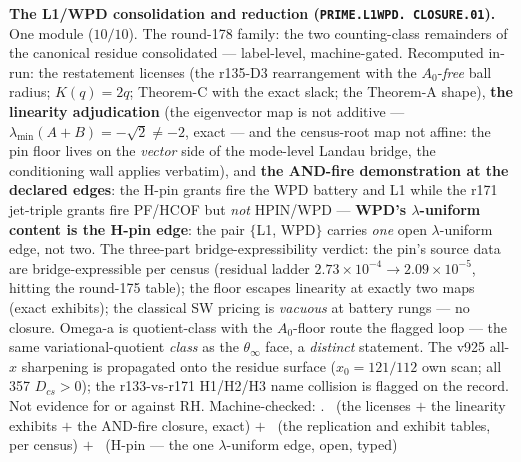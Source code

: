 \documentclass[11pt,a4paper]{article}
\theoremstyle{definition}
\begin{document}
\par\smallskip\noindent\textbf{The L1/WPD consolidation and
reduction (\texttt{PRIME.\allowbreak L1WPD.\allowbreak
CLOSURE.01}).}
One module ($10/10$).  The round-178 family: the two counting-class
remainders of the canonical residue consolidated --- label-level,
machine-gated.  Recomputed in-run: the restatement licenses (the
r135-D3 rearrangement with the $A_0$-\emph{free} ball radius;
$K(q) = 2q$; Theorem-C with the exact slack; the Theorem-A shape),
\textbf{the linearity adjudication} (the eigenvector map is not
additive --- $\lambda_{\min}(A+B) = -\sqrt{2} \ne -2$, exact ---
and the census-root map not affine: the pin floor lives on the
\emph{vector} side of the mode-level Landau bridge, the
 conditioning wall applies
verbatim), and \textbf{the AND-fire demonstration at the declared
edges}: the H-pin grants fire the WPD battery and L1 while the
r171 jet-triple grants fire PF/HCOF but \emph{not} HPIN/WPD ---
\textbf{WPD's $\lambda$-uniform content is the H-pin edge}: the
pair $\{$L1, WPD$\}$ carries \emph{one} open $\lambda$-uniform
edge, not two.  The three-part bridge-expressibility verdict: the
pin's source data are bridge-expressible per census (residual
ladder $2.73\times10^{-4} \to 2.09\times10^{-5}$, hitting the
round-175 table); the floor escapes linearity at exactly two maps
(exact exhibits); the classical SW pricing is \emph{vacuous} at
battery rungs --- no closure.  Omega-a is quotient-class with the
$A_0$-floor route the flagged loop --- the same variational-quotient
\emph{class} as the $\theta_\infty$ face, a \emph{distinct}
statement.  The v925 all-$x$ sharpening is propagated onto the
residue surface ($x_0 = 121/112$ own scan; all 357 $D_{cs} > 0$);
the r133-vs-r171 H1/H2/H3 name collision is flagged on the record.
Not evidence for or against RH.
Machine-checked: .
\mE\ (the licenses $+$ the linearity exhibits $+$ the AND-fire
closure, exact) $+$ \mC\ (the replication and exhibit tables, per
census) $+$ \mO\ (H-pin --- the one $\lambda$-uniform edge, open,
typed)
\par\smallskip
\end{document}
